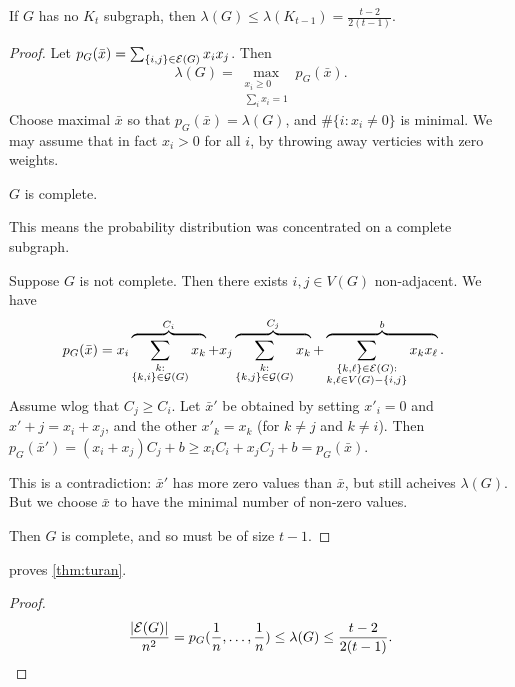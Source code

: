 \begin{theorem} \label{thm:lambda_G}
If $G$ has no $K_t$ subgraph, then $\lambda(G) \leq \lambda(K_{t-1}) = \frac{t-2}{2(t-1)}$.
\end{theorem}
\begin{proof}	
Let $p_G(\bar x) = \sum_{\{i,j\}\in \mathcal{E} (G)} x_i x_j$. Then
\[
\lambda(G) = \max_{\substack{x_i\geq 0 \\ \sum_i x_i =1}} p_G(\bar x).
\]
Choose maximal $\bar x$ so that $p_G(\bar x) = \lambda(G)$, and $\#\{i: x_i \neq 0\}$ is minimal.
We may assume that in fact $x_i>0$ for all $i$, by throwing away verticies with zero weights.
\begin{claim}
$G$ is complete.
\end{claim}
\begin{remark}
This means the probability distribution was concentrated on a complete subgraph.
\end{remark}
\begin{subproof}
Suppose $G$ is not complete. Then there exists $i,j\in V(G)$ non-adjacent. We have
\begin{align*}	
p_G(\bar x) &= x_i \overbrace{\sum_{\substack{k: \\ \{k,i\} \in \mathcal{G}(G)}} x_k}^{C_i} + x_j \overbrace{ \sum_{\substack{k: \\ \{k,j\} \in \mathcal{G}(G)}} x_k}^{C_j} + \overbrace{\sum_{\substack{\{k,\ell\} \in \mathcal{E} (G):\\ k,\ell \in V(G)- \{i,j\} }} x_k x_\ell}^{b}.
\end{align*}
Assume wlog that $C_j\geq C_i$. Let $\bar x'$ be obtained by setting $x'_i=0$ and $x'+j = x_i + x_j$, and the other $x'_k = x_k$ (for $k\neq j$ and $k\neq i$). Then $p_G(\bar x') = (x_i+x_j) C_j + b \geq x_i C_i + x_j C_j + b = p_G(\bar x)$.

This is a contradiction: $\bar x'$ has more zero values than $\bar x$, but still acheives $\lambda(G)$. But we choose $\bar x$ to have the minimal number of non-zero values.
\end{subproof}
Then $G$ is complete, and so must be of size $t-1$.
\end{proof}

\begin{remark}
  proves \cref{thm:turan}.
\end{remark}
\begin{proof}	
\[
\frac{|\mathcal{E} (G)|}{n^2}=p_G(\frac{1}{n}, \dotsc, \frac{1}{n}) \leq\lambda(G) \leq \frac{t-2}{2(t-1)}.\qedhere
\]
\end{proof}

